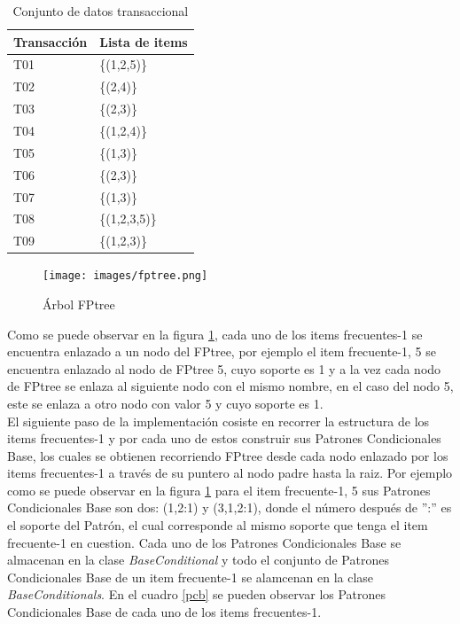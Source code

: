 \newpage
\begin{table}[!h]
\begin{center}
\begin{tabular}{|p{25mm}|p{35mm}|}\hline
\textbf{Transacci\'on} & \textbf{Lista de items}\\ \hline\hline
T01 & \{(1,2,5)\}\\ \hline
T02 & \{(2,4)\}\\ \hline
T03 & \{(2,3)\}\\ \hline
T04 & \{(1,2,4)\}\\ \hline
T05 & \{(1,3)\}\\ \hline
T06 & \{(2,3)\}\\ \hline
T07 & \{(1,3)\}\\ \hline
T08 & \{(1,2,3,5)\}\\ \hline
T09 & \{(1,2,3)\}\\ \hline
\end{tabular}
\end{center}
\caption{Conjunto de datos transaccional}
\label{datos1}
\end{table}

\begin{figure}[!h]
\centering
\texttt{[image: images/fptree.png]}
\caption{\'Arbol FPtree}
\label{arbolfptree}
\end{figure}

Como se puede observar en la figura \ref{arbolfptree}, cada uno de los items frecuentes-1 se encuentra enlazado a
un nodo del FPtree, por ejemplo el item frecuente-1, 5 se encuentra enlazado al nodo de FPtree 5, cuyo soporte es
1 y a la vez cada nodo de FPtree se enlaza al siguiente nodo con el mismo nombre, en el caso del nodo 5, este se
enlaza a otro nodo con valor 5 y cuyo soporte es 1.\\

El siguiente paso de la implementaci\'on cosiste en recorrer la estructura de los items frecuentes-1 y por cada
uno de estos construir sus Patrones Condicionales Base, los cuales se obtienen recorriendo FPtree desde cada nodo
enlazado por los items frecuentes-1 a trav\'es de su puntero al nodo padre hasta la raiz. Por ejemplo como se
puede observar en la figura \ref{arbolfptree} para el item frecuente-1, 5 sus Patrones Condicionales Base son
dos: (1,2:1) y (3,1,2:1), donde el n\'umero despu\'es de '':'' es el soporte del Patr\'on, el cual corresponde al
mismo soporte que tenga el item frecuente-1 en cuestion. Cada uno de los Patrones Condicionales Base se almacenan
en la clase \textit{BaseConditional} y todo el conjunto de Patrones Condicionales Base de un item frecuente-1 se
alamcenan en la clase \textit{BaseConditionals}. En el cuadro \ref{pcb} se pueden observar los Patrones
Condicionales Base de cada uno de los items frecuentes-1.\\

